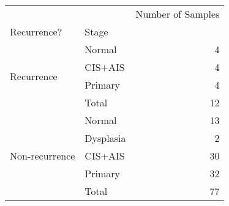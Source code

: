 \begin{tabular}{l|lr}
\toprule
               &       & Number of Samples \\
Recurrence? & Stage &                   \\
\midrule
\multirow{4}{*}{Recurrence} & Normal &                 4 \\
               & CIS+AIS &                 4 \\
               & Primary &                 4 \\
               & Total &                12 \\
\cline{1-3}
\multirow{5}{*}{Non-recurrence} & Normal &                13 \\
               & Dysplasia &                 2 \\
               & CIS+AIS &                30 \\
               & Primary &                32 \\
               & Total &                77 \\
\bottomrule
\end{tabular}

